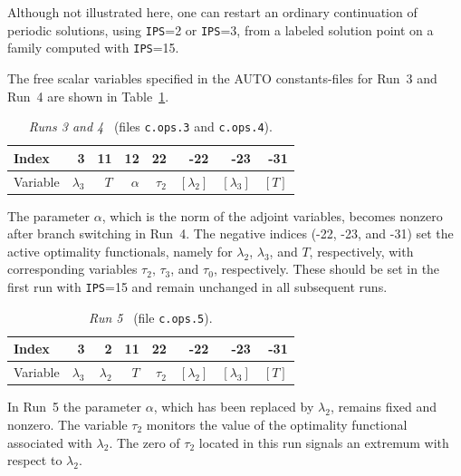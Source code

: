 \documentclass[12pt]{report}
\begin{document}
Although not illustrated here, one can restart an ordinary
continuation of periodic solutions, using {\tt IPS}=2 or {\tt IPS}=3,
from a labeled solution point on a family computed with {\tt IPS}=15.

\newpage
The free scalar variables specified in the {\cal AUTO} constants-files
for Run~3 and Run~4 are shown in  Table~\ref{tbl:demo_ops_1}.

\begin{table}[htbp]
\begin{center}
\begin{tabular}{| l | r | r | r | r | r | r | r |}
\hline
  Index& 3 & 11 & 12 & 22  & -22 & -23 & -31 \\
\hline
  Variable& $\lambda_3$ & $T$ &  $\alpha$ & $\tau_2$  
  & $[\lambda_2]$ & $[\lambda_3]$ & $[T]$ \\
\hline
\end{tabular}
\caption{{\it Runs 3 and 4}~ (files {\tt c.ops.3} and {\tt c.ops.4}).}
\label{tbl:demo_ops_1}
\end{center}
\end{table}

The parameter $\alpha$, which is the norm of the adjoint variables,
becomes nonzero after branch switching in Run~4.
The negative indices (-22, -23, and -31) set the active optimality 
functionals, namely for $\lambda_2$, $\lambda_3$, and $T$, respectively,
with corresponding variables $\tau_2$, $\tau_3$, and $\tau_0$,
respectively.
These should be set in the first run with {\tt IPS}=15 and remain unchanged
in all subsequent runs.


\begin{table}[htbp]
\begin{center}
\begin{tabular}{| l | r | r | r | r | r | r | r |}
\hline
  Index& 3 & ~2 & 11 & 22  & -22 & -23 & -31 \\
\hline
  Variable& $\lambda_3$ & $\lambda_2$ & $T$ & $\tau_2$  
  & $[\lambda_2]$ & $[\lambda_3]$ & $[T]$ \\
\hline
\end{tabular}
\caption{{\it Run 5}~ (file {\tt c.ops.5}).}
\label{tbl:demo_ops_2}
\end{center}
\end{table}

In Run~5 the parameter $\alpha$, which has been replaced by $\lambda_2$,
remains fixed and nonzero.
The variable $\tau_2$ monitors the value of the optimality functional 
associated with $\lambda_2$.
The zero of $\tau_2$ located in this run signals an extremum  
with respect to $\lambda_2$.
\end{document}
